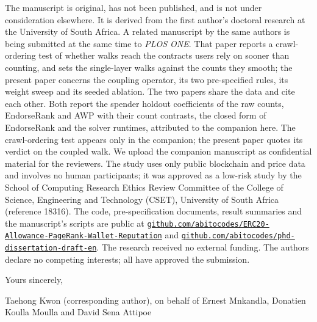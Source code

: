 \documentclass[11pt]{article}
\begin{document}
The manuscript is original, has not been published, and is not under consideration elsewhere. It is derived from the first author's doctoral research at the University of South Africa. A related manuscript by the same authors is being submitted at the same time to \emph{PLOS ONE}. That paper reports a crawl-ordering test of whether walks reach the contracts users rely on sooner than counting, and sets the single-layer walks against the counts they smooth; the present paper concerns the coupling operator, its two pre-specified rules, its weight sweep and its seeded ablation. The two papers share the data and cite each other. Both report the spender holdout coefficients of the raw counts, EndorseRank and AWP with their count contrasts, the closed form of EndorseRank and the solver runtimes, attributed to the companion here. The crawl-ordering test appears only in the companion; the present paper quotes its verdict on the coupled walk. We upload the companion manuscript as confidential material for the reviewers. The study uses only public blockchain and price data and involves no human participants; it was approved as a low-risk study by the School of Computing Research Ethics Review Committee of the College of Science, Engineering and Technology (CSET), University of South Africa (reference 18316). The code, pre-specification documents, result summaries and the manuscript's scripts are public at \href{https://github.com/abitocodes/ERC20-Allowance-PageRank-Wallet-Reputation}{\nolinkurl{github.com/abitocodes/ERC20-Allowance-PageRank-Wallet-Reputation}} and \href{https://github.com/abitocodes/phd-dissertation-draft-en}{\nolinkurl{github.com/abitocodes/phd-dissertation-draft-en}}. The research received no external funding. The authors declare no competing interests; all have approved the submission.

Yours sincerely,

Taehong Kwon (corresponding author), on behalf of Ernest Mnkandla, Donatien Koulla Moulla and David Sena Attipoe
\end{document}
